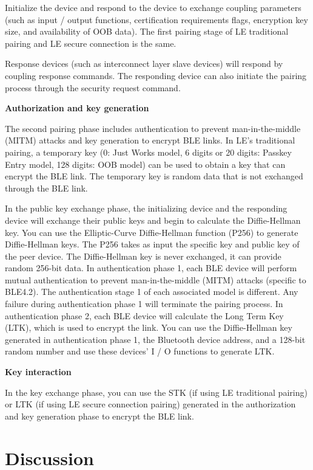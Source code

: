 \documentclass[11pt,en]{elegantpaper}
\begin{document}
Initialize the device and respond to the device to exchange coupling parameters (such as input / output functions, certification requirements flags, encryption key size, and availability of OOB data). The first pairing stage of LE traditional pairing and LE secure connection is the same.

Response devices (such as interconnect layer slave devices) will respond by coupling response commands. The responding device can also initiate the pairing process through the security request command.

\noindent\textbf{Authorization and key generation}

The second pairing phase includes authentication to prevent man-in-the-middle (MITM) attacks and key generation to encrypt BLE links. In LE's traditional pairing, a temporary key (0: Just Works model, 6 digits or 20 digits: Passkey Entry model, 128 digits: OOB model) can be used to obtain a key that can encrypt the BLE link. The temporary key is random data that is not exchanged through the BLE link.

In the public key exchange phase, the initializing device and the responding device will exchange their public keys and begin to calculate the Diffie-Hellman key. You can use the Elliptic-Curve Diffie-Hellman function (P256) to generate Diffie-Hellman keys. The P256 takes as input the specific key and public key of the peer device. The Diffie-Hellman key is never exchanged, it can provide random 256-bit data. In authentication phase 1, each BLE device will perform mutual authentication to prevent man-in-the-middle (MITM) attacks (specific to BLE4.2). The authentication stage 1 of each associated model is different. Any failure during authentication phase 1 will terminate the pairing process. In authentication phase 2, each BLE device will calculate the Long Term Key (LTK), which is used to encrypt the link. You can use the Diffie-Hellman key generated in authentication phase 1, the Bluetooth device address, and a 128-bit random number and use these devices' I / O functions to generate LTK.

\noindent\textbf{Key interaction}

In the key exchange phase, you can use the STK (if using LE traditional pairing) or LTK (if using LE secure connection pairing) generated in the authorization and key generation phase to encrypt the BLE link.

\section{Discussion}
\end{document}
